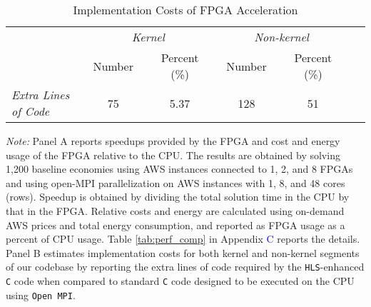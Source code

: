 \documentclass[12pt,american]{article}
\makeatletter
\newcommand{\extraLinesKernel}{75}
\newcommand{\extraLinesKernelpercent}{5.37}
\newcommand{\extraLinesNonkernel}{128}
\newcommand{\extraLinesNonkernelpercent}{51}
\newcommand{\numbeconII}{1,200\@\xspace}
\makeatother
\begin{document}
\begin{table}[ht!]
\begin{center}
\begin{subtable}{\textwidth}
\caption{Implementation Costs of FPGA Acceleration}
\label{tab:baseline:B} %
\begin{tabularx}{\textwidth}{p{4.5cm}XXXXXXXXXX}
\toprule
&&\multicolumn{3}{c}{\textit{Kernel}}&&\multicolumn{3}{c}{\textit{Non-kernel}}& \\
&&\multicolumn{1}{c}{Number}&&\multicolumn{1}{c}{Percent (\%)}&&\multicolumn{1}{c}{Number}&&\multicolumn{1}{c}{Percent (\%)} \\
\cmidrule{3-5}\cmidrule{7-9}
\textit{Extra Lines of Code} &&\multicolumn{1}{c}{\extraLinesKernel}&&\multicolumn{1}{c}{\extraLinesKernelpercent}&&\multicolumn{1}{c}{\extraLinesNonkernel}&&\multicolumn{1}{c}{\extraLinesNonkernelpercent} \\
\bottomrule
\end{tabularx}
\end{subtable}
\end{center}
\small \textit{Note:} Panel A reports speedups provided by the FPGA and cost and energy usage of the FPGA relative to the CPU. The results are obtained by solving \numbeconII baseline economies using AWS instances connected to 1, 2, and 8 FPGAs and using open-MPI parallelization on AWS instances with 1, 8, and 48 cores (rows). Speedup is obtained by dividing the total solution time in the CPU by that in the FPGA. Relative costs and energy are calculated using on-demand AWS prices and total energy consumption, and reported as FPGA usage as a percent of CPU usage. Table \ref{tab:perf_comp} in Appendix \textcolor{blue}{C} reports the details. Panel B estimates implementation costs for both kernel and non-kernel segments of our codebase by reporting the extra lines of code required by the \texttt{HLS}-enhanced \texttt{C} code when compared to standard \texttt{C} code designed to be executed on the CPU using \texttt{Open MPI}.
\end{table}
\end{document}
